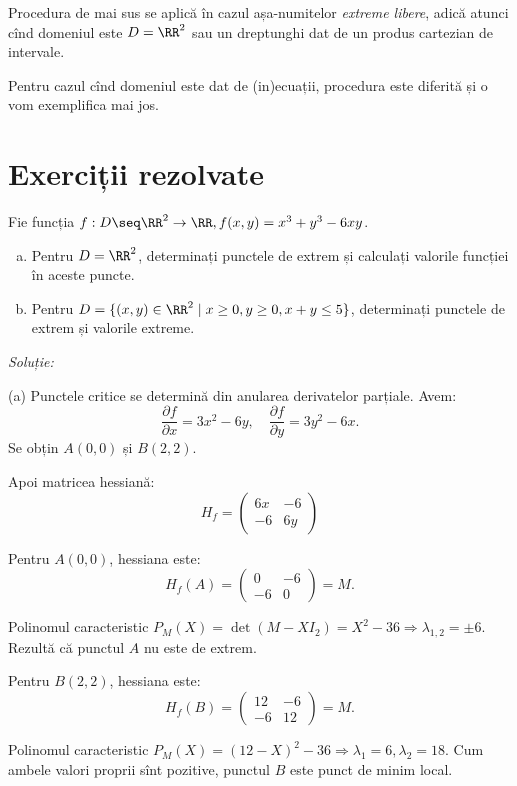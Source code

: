 Procedura de mai sus se aplică în cazul așa-numitelor \emph{extreme libere},
adică atunci cînd domeniul este $ D = \RR^2 $ sau un dreptunghi dat de un
produs cartezian de intervale.

Pentru cazul cînd domeniul este dat de (in)ecuații, procedura este diferită
și o vom exemplifica mai jos.


\section{Exerciții rezolvate}

Fie funcția $ f : D \seq \RR^2 \to \RR, f(x, y) = x^3 + y^3 - 6xy $.
\begin{enumerate}[(a)]
\item Pentru $ D = \RR^2 $, determinați punctele de extrem și calculați
  valorile funcției în aceste puncte.
\item Pentru $ D = \{ (x, y) \in \RR^2 \mid x \geq 0, y \geq 0, x + y \leq 5 \} $,
  determinați punctele de extrem și valorile extreme.
\end{enumerate}

\emph{Soluție:}

(a) Punctele critice se determină din anularea derivatelor parțiale. Avem:
\[
  \frac{\partial f}{\partial x} = 3x^2 - 6y, \quad %
  \frac{\partial f}{\partial y} = 3y^2 - 6x.
\]
Se obțin $ A(0, 0) $ și $ B(2, 2) $.

Apoi matricea hessiană:
\[
  H_f = \begin{pmatrix}
    6x & -6 \\
    -6 & 6y
  \end{pmatrix}
\]

Pentru $ A(0, 0) $, hessiana este:
\[
  H_f(A) = \begin{pmatrix}
    0 & -6 \\
    -6 & 0
  \end{pmatrix} = M.
\]

Polinomul caracteristic $ P_M(X) = \det (M - XI_2) = X^2 - 36 \Rightarrow \lambda_{1,2} = \pm 6 $.
Rezultă că punctul $ A $ nu este de extrem.

Pentru $ B(2, 2) $, hessiana este:
\[
  H_f(B) = \begin{pmatrix}
    12 & -6 \\
    -6 & 12
  \end{pmatrix} = M.
\]

Polinomul caracteristic $ P_M(X) = (12 - X)^2 - 36 \Rightarrow \lambda_1 = 6, \lambda_2 = 18 $.
Cum ambele valori proprii sînt pozitive, punctul $ B $ este punct de minim local.

